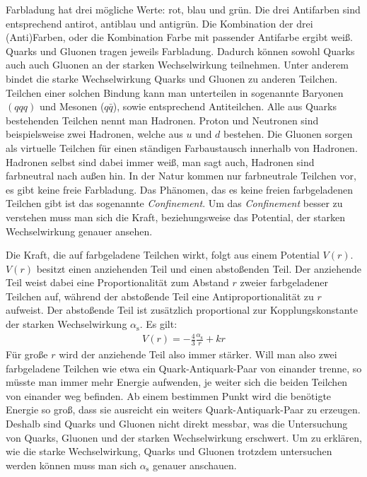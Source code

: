 Farbladung hat drei m\"ogliche \glqq{}Werte\grqq{}: rot, blau und gr\"un.
Die drei Antifarben sind entsprechend antirot, antiblau und antigr\"un.
Die Kombination der drei (Anti)Farben, oder die Kombination Farbe mit passender Antifarbe ergibt wei{\ss}.
Quarks und Gluonen tragen jeweils Farbladung.
Dadurch k\"onnen sowohl Quarks auch auch Gluonen an der starken Wechselwirkung teilnehmen.
Unter anderem bindet die starke Wechselwirkung Quarks und Gluonen zu anderen Teilchen.
Teilchen einer solchen Bindung kann man unterteilen in sogenannte Baryonen $(qqq)$ und Mesonen ($q\bar{q}$), sowie entsprechend Antiteilchen. Alle aus Quarks bestehenden Teilchen nennt man Hadronen.
Proton und Neutronen sind beispielsweise zwei Hadronen, welche aus $u$ und $d$ bestehen.
Die Gluonen sorgen als virtuelle Teilchen f\"ur einen st\"andigen Farbaustausch innerhalb von Hadronen.
Hadronen selbst sind dabei immer wei{\ss}, man sagt auch, Hadronen sind farbneutral nach au{\ss}en hin.
In der Natur kommen nur farbneutrale Teilchen vor, es gibt keine freie Farbladung.
Das Ph\"anomen, das es keine freien farbgeladenen Teilchen gibt ist das sogenannte \textit{Confinement}.
Um das \textit{Confinement} besser zu verstehen muss man sich die Kraft, beziehungsweise das Potential, der starken Wechselwirkung genauer ansehen.

Die Kraft, die auf farbgeladene Teilchen wirkt, folgt aus einem Potential $V(r)$.
$V(r)$ besitzt einen anziehenden Teil und einen abstoßenden Teil.
Der anziehende Teil weist dabei eine Proportionalit\"at zum Abstand $r$ zweier farbgeladener Teilchen auf, w\"ahrend der absto{\ss}ende Teil eine Antiproportionalit\"at zu $r$ aufweist.
Der absto{\ss}ende Teil ist zus\"atzlich proportional zur Kopplungskonstante der starken Wechselwirkung $\alpha_\text{s}$.
Es gilt:
\begin{align} \label{eq:Potential}
V(r) = -\frac{4}{3}\frac{\alpha_\text{s}}{r} + kr
\end{align}
F\"ur gro{\ss}e $r$ wird der anziehende Teil also immer stärker.
Will man also zwei farbgeladene Teilchen wie etwa ein Quark-Antiquark-Paar von einander trenne, so m\"usste man immer mehr Energie aufwenden, je weiter sich die beiden Teilchen von einander weg befinden.
Ab einem bestimmen Punkt wird die ben\"otigte Energie so gro{\ss}, dass sie ausreicht ein weiters Quark-Antiquark-Paar zu erzeugen.
Deshalb sind Quarks und Gluonen nicht direkt messbar, was die Untersuchung von Quarks, Gluonen und der starken Wechselwirkung erschwert.
Um zu erkl\"aren, wie die starke Wechselwirkung, Quarks und Gluonen trotzdem untersuchen werden k\"onnen muss man sich $\alpha_\text{s}$ genauer anschauen. 

